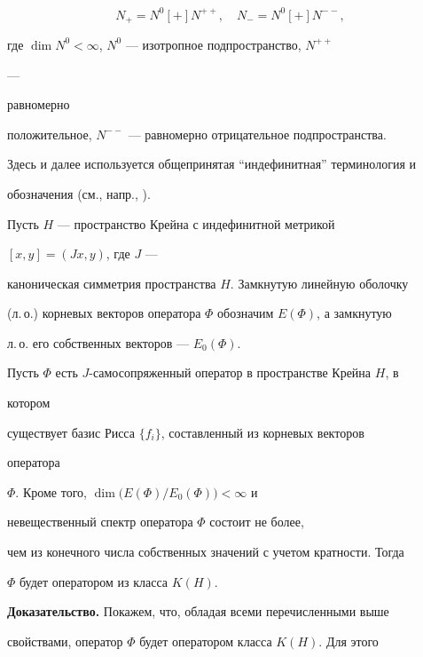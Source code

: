 \begin{equation}


N_+=N^0[+]N^{++},\quad N_-=N^0[+]N^{--},


\end{equation}


где $\dim N^0<\infty$, $N^0$ --- изотропное подпространство, $N^{++}$


---


равномерно


положительное, $N^{--}$ --- равномерно отрицательное подпространства.


Здесь и далее используется общепринятая ``индефинитная'' терминология и


обозначения (см., напр., \cite{Azi}).





Пусть $H$ --- пространство Крейна с индефинитной метрикой


$[x,y]=(Jx,y)$, где $J$ ---


каноническая симметрия пространства $H$. Замкнутую линейную оболочку


(л.\,о.) корневых векторов оператора $\Phi$ обозначим $E(\Phi)$, а замкнутую


л.\,о. его собственных векторов --- $E_0(\Phi)$.





\begin{thmnonum}


Пусть $\Phi$ есть $J$-самосопряженный оператор в пространстве Крейна $H$, в


котором


существует базис Рисса $\{f_i\}$, составленный из корневых векторов


оператора


$\Phi$. Кроме того, $\dim\bigl(E(\Phi)/E_0(\Phi)\bigr)<\infty$ и


невещественный спектр оператора $\Phi$ состоит не более,


чем из конечного числа собственных значений с учетом кратности. Тогда


$\Phi$ будет оператором из класса $K(H)$.


\end{thmnonum}





{\bf Доказательство.} Покажем, что, обладая всеми перечисленными выше


свойствами, оператор $\Phi$ будет оператором класса $K(H)$. Для этого


